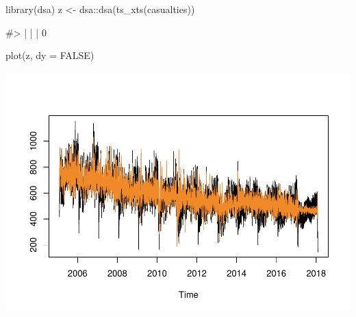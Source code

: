 \begin{Schunk}
\begin{Sinput}
library(dsa)
z <- dsa::dsa(ts_xts(casualties))
\end{Sinput}
\begin{Soutput}
#>   |                                                                              |                                                                      |   0%
\end{Soutput}
\begin{Sinput}
plot(z, dy = FALSE)
\end{Sinput}

\includegraphics[width=1\linewidth]{overview_files/figure-latex/dsa-1} \end{Schunk}

